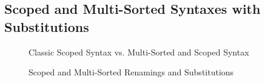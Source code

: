 \documentclass[screen,nonacm]{acmart}
\begin{document}
\subsection{Scoped and Multi-Sorted Syntaxes with Substitutions}\label{sec:pre-syn}
\begin{figure}[h]
      \centering
      \begin{minipage}[t]{0.48\linewidth}
            \raggedright{}
            \EScoped{}
      \end{minipage}
      \hfill
      \begin{minipage}[t]{0.48\linewidth}
            \raggedright{}
            \EMultiSorted{}
      \end{minipage}
      \caption{Classic Scoped Syntax vs. Multi-Sorted and Scoped Syntax}
      \label{fig:pre:svm}
\end{figure}

\begin{figure}[h]
      \centering
      \begin{minipage}[t]{0.48\linewidth}
            \raggedright{}
            \ERen{}
      \end{minipage}
      \hfill
      \begin{minipage}[t]{0.48\linewidth}
            \raggedright{}
            \ESub{}
      \end{minipage}
      \caption{Scoped and Multi-Sorted Renamings and Substitutions}
      \label{fig:pre:ras}
\end{figure}

\end{document}
